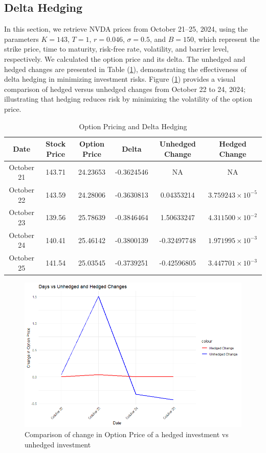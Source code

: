 \subsection{Delta Hedging}

In this section, we retrieve NVDA prices from October 21--25, 2024, using the parameters \( K = 143 \), \( T = 1 \), \( r = 0.046 \), \( \sigma = 0.5 \), and \( B = 150 \), which represent the strike price, time to maturity, risk-free rate, volatility, and barrier level, respectively. We calculated the option price and its delta. The unhedged and hedged changes are presented in Table (\ref{tab:hedging}), demonstrating the effectiveness of delta hedging in minimizing investment risks. Figure (\ref{fig:hedgingvunhedging}) provides a visual comparison of hedged versus unhedged changes from October 22 to 24, 2024; illustrating that hedging reduces risk by minimizing the volatility of the option price.

\begin{table}[h]
    \centering
    \caption{Option Pricing and Delta Hedging}
    \label{tab:hedging}
    \begin{tabular}{|c|c|c|c|c|c|}
        \hline
        \textbf{Date} & \textbf{Stock Price} & \textbf{Option Price} & \textbf{Delta} & \textbf{Unhedged Change} & \textbf{Hedged Change} \\
        \hline
        October 21 & 143.71 & 24.23653 & -0.3624546 & NA & NA \\
        \hline
        October 22 & 143.59 & 24.28006 & -0.3630813 & 0.04353214 & $3.759243 \times 10^{-5}$ \\
        \hline
        October 23 & 139.56 & 25.78639 & -0.3846464 & 1.50633247 & $4.311500 \times 10^{-2}$ \\
        \hline
        October 24 & 140.41 & 25.46142 & -0.3800139 & -0.32497748 & $1.971995 \times 10^{-3}$ \\
        \hline
        October 25 & 141.54 & 25.03545 & -0.3739251 & -0.42596805 & $3.447701 \times 10^{-3}$ \\
        \hline
    \end{tabular}
\end{table}

\begin{figure}[h]
    \centering
    \includegraphics[width=0.65\linewidth]{content/images/hedgedvsunhedged.png}
    \caption{Comparison of change in Option Price of a hedged investment vs unhedged investment}
    \label{fig:hedgingvunhedging}
\end{figure}

